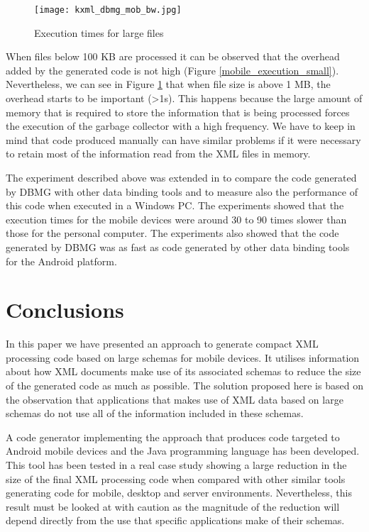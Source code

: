 \documentclass{sig-alternate}
\begin{document}
\begin{figure}
 \begin{center}
\texttt{[image: kxml\_dbmg\_mob\_bw.jpg]}\\
\caption{Execution times for large files}\label{fig:mobile_execution}
\end{center}
\end{figure}

When files below 100 KB are processed it can be observed that the overhead added by the generated code is not high (Figure \ref{mobile_execution_small}). Nevertheless, we can see in Figure \ref{fig:mobile_execution} that when file size is above 1 MB, the overhead starts to be important (>1s). This happens because the large amount of memory that is required to store the information that is being processed forces the execution of the garbage collector with a high frequency.  We have to keep in mind that code produced manually can have similar problems if  it were necessary to retain most of the information read from the XML files in memory.

The experiment described above was extended in \cite{proc:tamayo6} to compare the code generated by DBMG with other data binding tools and to measure also the performance of this code when executed in a Windows PC. The experiments showed that the execution times for the mobile devices were around 30 to 90 times slower than those for the personal computer. The experiments also showed that the code generated by DBMG was as fast as code generated by other data binding tools for the Android platform.



\section{Conclusions}

In this paper we have presented an approach to generate
compact XML processing code based on large schemas for
mobile devices. It utilises information about how XML documents make use
of its associated schemas to reduce the size of the generated code as much as possible. The solution proposed here is based on the observation that applications that makes use of XML data based on large schemas do not use all of the information included in these schemas. 

A code generator implementing the approach that produces code targeted to Android mobile devices and the Java programming language has been developed.  This tool has been tested in a real case study showing a large reduction in the size of the final XML processing code when compared with other similar tools generating code for mobile, desktop and server environments. Nevertheless, this result must be looked at with caution as the magnitude of the reduction will depend directly from the use that specific applications make of their schemas. 
\end{document}
